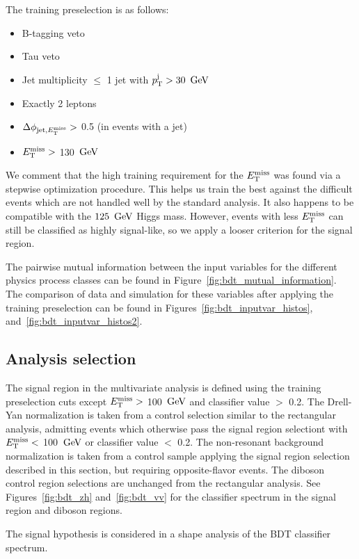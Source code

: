 The training preselection is as follows:
\begin{itemize}
\item B-tagging veto
\item Tau veto
\item Jet multiplicity $\leq$ 1 jet with $p_{\mathrm{T}}^{\rm j} > 30~\,\text{Ge\hspace{-.08em}V}$
\item Exactly 2 leptons
\item $\Delta \phi_{{\rm jet},E_\mathrm{T}^{\mathrm{miss}}} >$ 0.5 (in events with a jet)
\item $E_\mathrm{T}^{\mathrm{miss}} >$ 130 $\,\text{Ge\hspace{-.08em}V}$
\end{itemize}
We comment that the high training requirement for the $E_\mathrm{T}^{\mathrm{miss}}$ was found via a stepwise optimization procedure.
This helps us train the best against the difficult events which are not handled well by the standard analysis.
It also happens to be compatible with the $125~\,\text{Ge\hspace{-.08em}V}$ Higgs mass.
However, events with less $E_\mathrm{T}^{\mathrm{miss}}$ can still be classified as highly signal-like, so we apply a looser criterion for the signal region.

The pairwise mutual information between the input variables for the different physics process classes can be found in Figure~\ref{fig:bdt_mutual_information}.
The comparison of data and simulation for these variables after applying the training preselection can be found in Figures~\ref{fig:bdt_inputvar_histos}, and~\ref{fig:bdt_inputvar_histos2}.


\subsection{Analysis selection} 

The signal region in the multivariate analysis is defined using the training preselection cuts except $E_\mathrm{T}^{\mathrm{miss}} >$ 100 $\,\text{Ge\hspace{-.08em}V}$ and classifier value $>$ 0.2. 
The Drell-Yan normalization is taken from a control selection similar to the rectangular analysis, admitting events which otherwise pass the signal region selectiont with $E_\mathrm{T}^{\mathrm{miss}} <$ 100 $\,\text{Ge\hspace{-.08em}V}$ or classifier value $<$ 0.2.
The non-resonant background normalization is taken from a control sample applying the signal region selection 
described in this section, but requiring opposite-flavor events. The diboson control region 
selections are unchanged from the rectangular analysis. See Figures~\ref{fig:bdt_zh} 
and~\ref{fig:bdt_vv} for the classifier spectrum in the signal region and diboson regions.

The signal hypothesis is considered in a shape analysis of the BDT classifier spectrum. 

